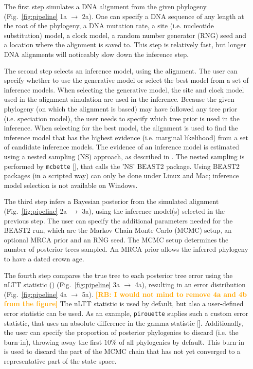 \documentclass{article}
\newcommand{\richel}[1]{\textcolor{orange}{\textbf{[RB: #1]}}}
\begin{document}
The first step simulates a DNA alignment from the given 
phylogeny (Fig.~\ref{fig:pipeline} 1a $\rightarrow$ 2a).
One can specify a DNA sequence
of any length at the root of the phylogeny, a DNA mutation rate, a
site (i.e. nucleotide substitution) model, 
a clock model, a random number generator (RNG) seed and a location
where the alignment is saved to. This step is relatively fast, but longer
DNA alignments will noticeably slow down the inference step.

The second step selects an inference model, using the alignment.
The user can specify whether to use the generative model or select the best model
from a set of inference models. 
When selecting the generative model,
the site and clock model used in the alignment simulation are used
in the inference. Because the given phylogeny (on which the alignment is based)
may have followed any tree prior (i.e. speciation model), the user needs
to specify which tree prior is used in the inference. 
When selecting for the best
model, the alignment is used to find the inference model that has the
highest evidence (i.e. marginal likelihood) from a set of candidate inference models.
The evidence of an inference model is estimated using a nested sampling (NS)
approach, as described in \cite{maturana2018model}. The nested sampling is
performed by \verb;mcbette; [\cite{mcbette}], that calls the 'NS' BEAST2 package. 
Using BEAST2 packages (in a scripted way) can only be done under Linux and Mac; 
inference model selection is not available on Windows.

The third step infers a Bayesian posterior from the simulated 
alignment (Fig.~\ref{fig:pipeline} 2a $\rightarrow$ 3a),
using the inference model(s) selected in the previous step. The user
can specify the additional parameters needed for the BEAST2 run, which
are the Markov-Chain Monte Carlo (MCMC) setup, 
an optional MRCA prior and an RNG seed.
The MCMC setup determines the number of posterior trees sampled.
An MRCA prior allows the inferred phylogeny to have a dated crown age.

The fourth step compares the true tree to each posterior tree
error using
the nLTT statistic (\cite{janzen2015approximate}) 
(Fig.~\ref{fig:pipeline} 3a $\rightarrow$ 4a), resulting
in an error distribution (Fig.~\ref{fig:pipeline} 4a $\rightarrow$ 5a).
\richel{I would not mind to remove 4a and 4b from the figure}
The nLTT statistic is used by default,
but also a user-defined error statistic can be used. As an example,
\verb;pirouette; suplies such a custom error statistic,
that uses an absolute difference in the gamma statistic [\cite{pybus2000testing}].
Additionally, the user can specify the
proportion of posterior phylogenies to 
discard (i.e. the burn-in), throwing away the first $10\%$
of all phylogenies by default. This burn-in is used to discard
the part of the MCMC chain that has not yet converged to a
representative part of the state space.
\end{document}
